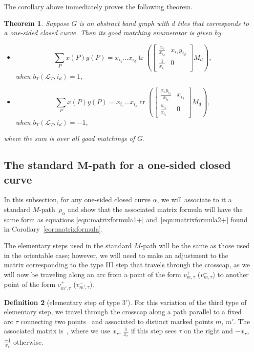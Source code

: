 \documentclass[10pt,a4paper]{amsart}
\numberwithin{equation}{section}
\newtheorem{Theorem}{Theorem}[section]
\theoremstyle{definition}
\newtheorem{Definition}[Theorem]{Definition}
\begin{document}
The corollary above immediately proves the following theorem.


\begin{Theorem}\label{theorem:quasigoodmatchingenum}
Suppose $G$ is an abstract band graph with $d$ tiles that corresponds to a one-sided closed curve. Then its good matching enumerator is given by
\begin{itemize}\itemsep=0pt
\item \[
\sum_Px(P)y(P)=x_{i_1}\ldots x_{i_d} \operatorname{tr}\left(\begin{bmatrix}
\frac{x_a}{x_{i_d}} & x_{i_1}y_{i_d}\\
\frac{1}{x_{i_1}} & 0
\end{bmatrix}M_d\right),\]
when $ b_{T}(\mathcal{L}_{T}, i_{d})=1$,
\item \[\sum_Px(P)y(P)=x_{i_1}\ldots x_{i_d} \operatorname{tr}\left(\begin{bmatrix}
\frac{x_ay_{i_d}}{x_{i_d}} & x_{i_1}\\
\frac{y_{i_d}}{x_{i_1}} & 0
\end{bmatrix}M_d\right),\]
 when $ b_{T}(\mathcal{L}_{T}, i_{d})=-1$,
\end{itemize}
where the sum is over all good matchings of $G$.
\end{Theorem}


\subsection[The standard M-path for a one-sided closed curve]{The standard $\boldsymbol{M}$-path for a one-sided closed curve}

In this subsection, for any one-sided closed curve $\alpha$, we will associate to it a standard $M$\nobreakdash-path~$\rho_{\alpha}$ and show that the associated matrix formula will have the same form as equations \eqref{eqn:matrixformula1+} and~\eqref{eqn:matrixformula2+} found in Corollary~\ref{cor:matrixformula}.

The elementary steps used in the standard $M$-path will be
the same as those used in the orientable case; however,
we will need to make an adjustment to the matrix corresponding to the type III step that
travels through the crosscap, as we will now be
traveling along an arc from a point of the form
$v_{m,\tau}^{+}$ ($v_{m,\tau}^{-}$) to another point of
the form $v_{m', \tau}^{+}$ ($v_{m',\tau}^{-}$).

\begin{Definition}[elementary step of type 3$'$]\label{definition:newstep}
For this variation of the third type of elementary step, we travel through the crosscap along a path parallel to a fixed arc $\tau$ connecting two points~ and  associated to distinct marked points $m$, $m'$. The associated matrix is~, where we use $x_r$, $\frac{1}{x_r}$ if this step sees $\tau$ on the right and $-x_r$, $\frac{-1}{x_r}$ otherwise.
\end{Definition}
\end{document}
